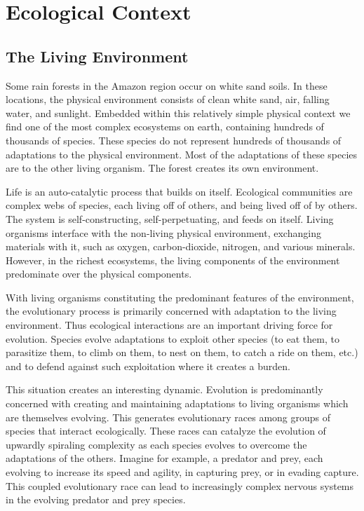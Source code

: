 \section{Ecological Context}

\subsection{The Living Environment}

Some rain forests in the Amazon region occur on white sand soils.
In these locations, the physical environment consists of clean white
sand, air, falling water, and sunlight.  Embedded within this relatively
simple physical context we find one of the most complex ecosystems
on earth, containing hundreds of thousands of species.  These species
do not represent hundreds of thousands of adaptations to the physical
environment.  Most of the adaptations of these species are to the
other living organism.  The forest creates its own environment.

Life is an auto-catalytic process that builds on itself.  Ecological
communities are complex webs of species, each living off of others, and
being lived off of by others.  The system is self-constructing,
self-perpetuating, and feeds on itself.  Living organisms interface with
the non-living physical environment, exchanging materials with it, such
as oxygen, carbon-dioxide, nitrogen, and various minerals.  However, in
the richest ecosystems, the living components of the environment predominate
over the physical components.

With living organisms constituting the predominant features of the
environment, the evolutionary process is primarily concerned with
adaptation to the living environment.  Thus ecological interactions
are an important driving force for evolution.  Species evolve adaptations
to exploit other species (to eat them, to parasitize them, to climb on
them, to nest on them, to catch a ride on them, etc.) and to defend
against such exploitation where it creates a burden.

This situation creates an interesting dynamic.  Evolution is
predominantly concerned with creating and maintaining adaptations
to living organisms which are themselves evolving.  This generates
evolutionary races among groups of species that interact ecologically.
These races can catalyze the evolution of upwardly spiraling complexity
as each species evolves to overcome the adaptations of the others.
Imagine for example, a predator and prey, each evolving to increase its
speed and agility, in capturing prey, or in evading capture.  This
coupled evolutionary race can lead to increasingly complex nervous
systems in the evolving predator and prey species.

